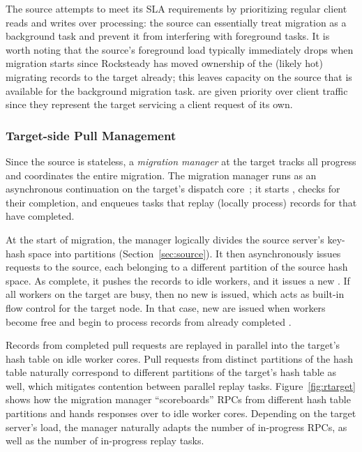 The source attempts to meet its SLA requirements by prioritizing regular client
reads and writes over \pull processing: the source can essentially treat
migration as a background task and prevent it from interfering with foreground
tasks. It is worth noting that the source's foreground load typically
immediately drops when migration starts since Rocksteady has moved
ownership of the (likely hot) migrating records to the target already; this
leaves capacity on the source that is available for the background migration
task. \priopulls are given priority over client traffic since they
represent the target servicing a client request of its own.


\subsubsection{Target-side Pull Management}

Since the source is stateless, a {\em migration manager} at the target tracks
all progress and coordinates the entire migration.  The migration manager runs
as an asynchronous continuation on the target's dispatch
core~\cite{stutsman:dcft}; it starts \pulls, checks for their
completion, and enqueues tasks that replay (locally process) records for \pulls
that have completed.

At the start of migration, the manager logically divides the source
server's key-hash
space into partitions (Section~\ref{sec:source}). It then asynchronously issues
\pull requests to the source, each belonging to a different partition of the
source hash space. As \pulls complete, it pushes the records to idle workers,
and it issues a new \pull. If all workers on the target are busy, then
no new \pull is issued, which acts as built-in flow control
for the target node. In that case, new \pulls are issued when workers become
free and begin to process records from already completed \pulls.

Records from completed pull requests are replayed in parallel into the
target's hash table on idle worker cores.  Pull requests from distinct
partitions of the hash table naturally correspond to different partitions of
the target's hash table as well, which mitigates contention between parallel
replay tasks.
Figure~\ref{fig:rtarget} shows how the
migration manager ``scoreboards'' \pull RPCs from different hash table partitions and
hands responses over to idle worker cores.
Depending on the target server's load, the manager naturally
adapts the number of in-progress \pull RPCs, as well as the number of
in-progress replay tasks.

